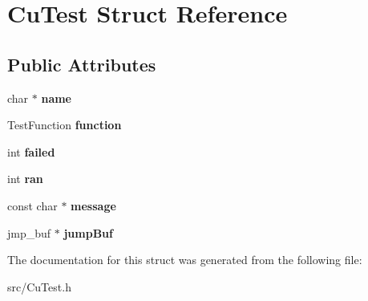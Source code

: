 \hypertarget{struct_cu_test}{}\section{Cu\+Test Struct Reference}
\label{struct_cu_test}
\subsection*{Public Attributes}
\begin{DoxyCompactItemize}
\item 
\mbox{\label{struct_cu_test_a6140dfce23321636d106d95efd4ccb93}} 
char $\ast$ {\bfseries name}
\item 
\mbox{\label{struct_cu_test_aac05c072bbf8b5ad2c1a1950633efbe5}} 
Test\+Function {\bfseries function}
\item 
\mbox{\label{struct_cu_test_af1334871dff4cf1e0e50d960952378e8}} 
int {\bfseries failed}
\item 
\mbox{\label{struct_cu_test_ae64f485765a24240e367d4a700855d24}} 
int {\bfseries ran}
\item 
\mbox{\label{struct_cu_test_a5d76ed2474dcc113ff4dd475db12b5a5}} 
const char $\ast$ {\bfseries message}
\item 
\mbox{\label{struct_cu_test_a7b96017be4b823324175a4aa9616def0}} 
jmp\+\_\+buf $\ast$ {\bfseries jump\+Buf}
\end{DoxyCompactItemize}


The documentation for this struct was generated from the following file\+:\begin{DoxyCompactItemize}
\item 
src/Cu\+Test.\+h\end{DoxyCompactItemize}
